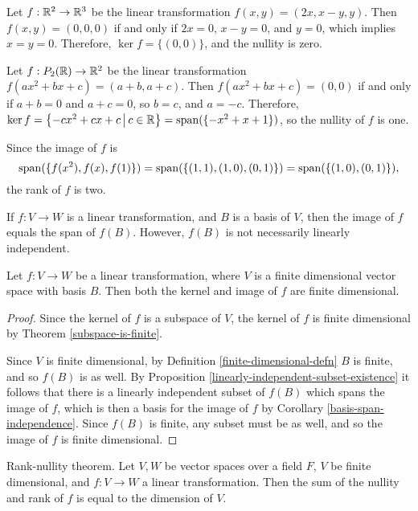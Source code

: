\begin{exmp}
    Let $f: \mathbb{R}^2 \to \mathbb{R}^3$ be the linear transformation $f(x, y) = (2x, x-y, y)$. Then $f(x, y) = (0, 0, 0)$ if and only if $2x = 0$, $x - y = 0$, and $y = 0$, which implies $x = y = 0$. Therefore, $\ker f = \{(0, 0)\}$, and the nullity is zero.
\end{exmp}

\begin{exmp}
    Let $f: P_2(\mathbb{R}) \to \mathbb{R}^2$ be the linear transformation $f(ax^2 + bx + c) = (a + b, a + c)$. Then $f(ax^2 + bx + c) = (0, 0)$ if and only if $a + b = 0$ and $a + c = 0$, so $b = c$, and $a = -c$. Therefore, $\ker f = \left\{-cx^2 + cx + c \,\middle|\, c \in \mathbb{R} \right\} = \operatorname{span}(\{-x^2 + x + 1\})$, so the nullity of $f$ is one.

    Since the image of $f$ is \[\operatorname{span}(\{f(x^2), f(x), f(1)\}) = \operatorname{span}(\{(1, 1), (1, 0), (0, 1)\}) = \operatorname{span}(\{(1, 0), (0, 1)\}),\] the rank of $f$ is two.
\end{exmp}

\begin{rmk}
    If $f: V \to W$ is a linear transformation, and $B$ is a basis of $V$, then the image of $f$ equals the span of $f(B)$. However, $f(B)$ is not necessarily linearly independent.
\end{rmk}

\begin{prop}\label{kernel-image-are-finite}
    Let $f: V \to W$ be a linear transformation, where $V$ is a finite dimensional vector space with basis $B$. Then both the kernel and image of $f$ are finite dimensional.
\end{prop}

\begin{proof}
    Since the kernel of $f$ is a subspace of $V$, the kernel of $f$ is finite dimensional by Theorem \ref{subspace-is-finite}.

    Since $V$ is finite dimensional, by Definition \ref{finite-dimensional-defn} $B$ is finite, and so $f(B)$ is as well. By Proposition \ref{linearly-independent-subset-existence} it follows that there is a linearly independent subset of $f(B)$ which spans the image of $f$, which is then a basis for the image of $f$ by Corollary \ref{basis-span-independence}. Since $f(B)$ is finite, any subset must be as well, and so the image of $f$ is finite dimensional.
\end{proof}

\begin{thm}\label{rank-nullity}
    Rank-nullity theorem. Let $V, W$ be vector spaces over a field $F$, $V$ be finite dimensional, and $f: V \to W$ a linear transformation. Then the sum of the nullity and rank of $f$ is equal to the dimension of $V$.
\end{thm}

